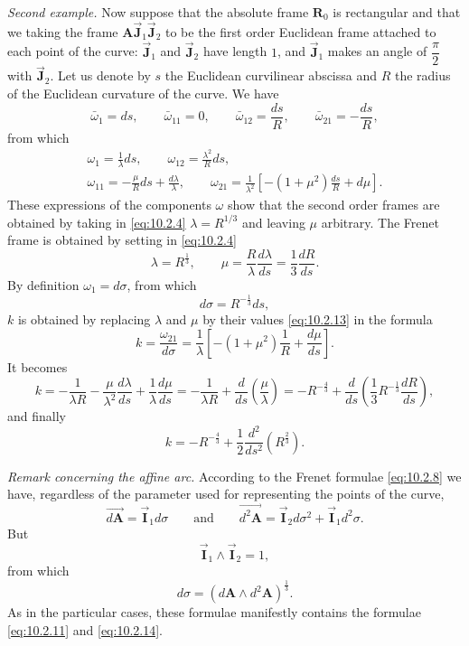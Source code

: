 \documentclass[leqno,11pt]{book}
\numberwithin{equation}{chapter}
\theoremstyle{shape1}
\theoremstyle{shapesmall}
\newcommand{\rvec}[1]{\vec{\mathbf{#1}}}
\newcommand{\ivec}{\rvec{I}}
\newcommand{\jvec}{\rvec{J}}
\newcommand{\somespace}{\vspace{9pt}}
\begin{document}
\emph{Second example.} Now suppose that the absolute frame $\mathbf{R}_{0}$ is rectangular and that we taking the frame $\mathbf{A}\jvec_{1}\jvec_{2}$ to be the first order Euclidean frame attached to each point of the curve: $\jvec_{1}$ and $\jvec_{2}$ have length $1$, and $\jvec_{1}$ makes an angle of $\dfrac{\pi}{2}$ with $\jvec_{2}$. Let us denote by $s$ the Euclidean curvilinear abscissa and $R$ the radius of the Euclidean curvature of the curve. We have
\[
\bar\omega_{1}=ds,\qquad\bar\omega_{11}=0,\qquad\bar\omega_{12}=\frac{ds}{R},\qquad\bar\omega_{21}=-\frac{ds}{R},
\]
from which
\begin{gather*}
  \omega_{1}=\frac{1}{\lambda}ds,\qquad\omega_{12}=\frac{\lambda^{2}}{R}ds,\\
  \omega_{11}=-\frac{\mu}{R}ds+\frac{d\lambda}{\lambda},\qquad\omega_{21}=\frac{1}{\lambda^{2}}\left[-(1+\mu^{2})\frac{ds}{R}+d\mu\right].
\end{gather*}
These expressions of the components $\omega$ show that the second order frames are obtained by taking in \eqref{eq:10.2.4} $\lambda=R^{1/3}$ and leaving $\mu$ arbitrary. The Frenet frame is obtained by setting in \eqref{eq:10.2.4}
\begin{equation}
  \label{eq:10.2.13}
  \lambda=R^{\frac{1}{3}},\qquad\mu=\frac{R}{\lambda}\frac{d\lambda}{ds}=\frac{1}{3}\frac{dR}{ds}.
\end{equation}
By definition $\omega_{1}=d\sigma$, from which
\begin{equation}
  \label{eq:10.2.14}
  d\sigma=R^{-\frac{1}{3}}ds,
\end{equation}
$k$ is obtained by replacing $\lambda$ and $\mu$ by their values \eqref{eq:10.2.13} in the formula
\[
k=\frac{\omega_{21}}{d\sigma}=\frac{1}{\lambda}\left[-(1+\mu^{2})\frac{1}{R}+\frac{d\mu}{ds}\right].
\]
It becomes
\[
k=-\frac{1}{\lambda R}-\frac{\mu}{\lambda^{2}}\frac{d\lambda}{ds}+\frac{1}{\lambda}\frac{d\mu}{ds}=-\frac{1}{\lambda R}+\frac{d}{ds}\left(\frac{\mu}{\lambda}\right)=-R^{-\frac{4}{3}}+\frac{d}{ds}\left(\frac{1}{3}R^{-\frac{1}{3}}\frac{dR}{ds}\right),
\]
and finally
\begin{equation}
  \label{eq:10.2.15}
  k=-R^{-\frac{4}{3}}+\frac{1}{2}\frac{d^{2}}{ds^{2}}(R^{\frac{2}{3}}).
\end{equation}

\somespace

\emph{Remark concerning the affine arc.} According to the Frenet formulae \eqref{eq:10.2.8} we have, regardless of the parameter used for representing the points of the curve,
\[
\overrightarrow{d\mathbf{A}}=\ivec_{1}d\sigma\qquad\text{and}\qquad\overrightarrow{d^{2}\mathbf{A}}=\ivec_{2}d\sigma^{2}+\ivec_{1}d^{2}\sigma.
\]
But
\[
\ivec_{1}\wedge\ivec_{2}=1,
\]
from which
\begin{equation}
  \label{eq:10.2.16}
  d\sigma=(d\mathbf{A}\wedge d^{2}\mathbf{A})^{\frac{1}{3}}.
\end{equation}
As in the particular cases, these formulae manifestly contains the formulae \eqref{eq:10.2.11} and \eqref{eq:10.2.14}.
\end{document}
